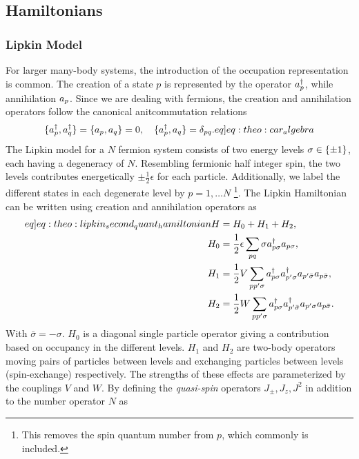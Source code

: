 
\subsection{Hamiltonians}
\subsubsection{Lipkin Model}
For larger many-body systems, the introduction of the occupation representation is common. The creation of a state $p$ is represented by the operator $a^{\dagger}_{p}$, while annihilation $a_{p}$. Since we are dealing with fermions, the creation and annihilation operators follow the canonical anitcommutation relations
\begin{align}
    \set{\crt{p},\crt{q}} = \set{\ani{p},\ani{q}} = 0, \hspace{10px}\set{\crt{p},\ani{q}} = \delta_{pq}. 
    \label[eq]{eq:theo:car_algebra}
\end{align}
The Lipkin model \citep{lipkinValidityManybodyApproximation1965} for a $N$ fermion system consists of two energy levels $\sigma \in \{\pm 1\}$, each having a degeneracy of $N$. Resembling fermionic half integer spin, the two levels contributes energetically $\pm \frac{1}{2}\epsilon$ for each particle. Additionally, we label the different states in each degenerate level by $p = 1, \ldots N$ \footnote{This removes the spin quantum number from $p$, which commonly is included.}. The Lipkin Hamiltonian can be written using creation and annihilation operators as 
\begin{align}
    \begin{split}\label[eq]{eq:theo:lipkin_second_quant_hamiltonian}
    H &= H_0 + H_1 + H_2, \\
    H_0 &= \frac{1}{2}\epsilon \sum_{pq} \sigma \crt{p\sigma} \ani{p\sigma}, \\
    H_1 &= \frac{1}{2}V \sum_{pp'\sigma} \crt{p\sigma}\crt{p'\sigma}\ani{p'\bar{\sigma}}\ani{p\bar{\sigma}}, \\
    H_2 &= \frac{1}{2}W \sum_{pp'\sigma} \crt{p\sigma} \crt{p'\bar{\sigma}} \ani{p'\sigma} \ani{p\bar{\sigma}}.
    \end{split}
\end{align}
With $\bar{\sigma} = -\sigma$. $H_0$ is a diagonal single particle operator giving a contribution based on occupancy in the different levels. $H_1$ and $H_2$ are two-body operators moving pairs of particles between levels and exchanging particles between levels (spin-exchange) respectively. The strengths of these effects are parameterized by the couplings $V$ and $W$. By defining the \textit{quasi-spin} operators $J_\pm , J_z, J^2$ in addition to the number operator $N$ as 
